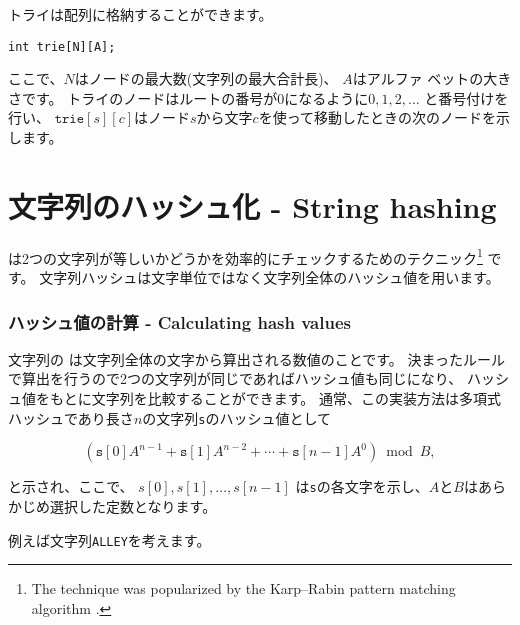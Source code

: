 トライは配列に格納することができます。
\begin{lstlisting}
int trie[N][A];
\end{lstlisting}
ここで、$N$はノードの最大数(文字列の最大合計長)、
$A$はアルファ ベットの大きさです。
トライのノードはルートの番号が0になるように$0,1,2,\ldots$ と番号付けを行い、
$\texttt{trie}[s][c]$はノード$s$から文字$c$を使って移動したときの次のノードを示します。

\section{文字列のハッシュ化 - String hashing}


は2つの文字列が等しいかどうかを効率的にチェックするためのテクニック\footnote{The technique
was popularized by the Karp–Rabin pattern matching
algorithm \cite{kar87}.}
です。
文字列ハッシュは文字単位ではなく文字列全体のハッシュ値を用います。

\subsubsection*{ハッシュ値の計算 - Calculating hash values}


文字列の
は文字列全体の文字から算出される数値のことです。
決まったルールで算出を行うので2つの文字列が同じであればハッシュ値も同じになり、
ハッシュ値をもとに文字列を比較することができます。
通常、この実装方法は多項式ハッシュであり長さ$n$の文字列\texttt{s}のハッシュ値として

\[(\texttt{s}[0] A^{n-1} + \texttt{s}[1] A^{n-2} + \cdots + \texttt{s}[n-1] A^0) \bmod B  ,\]

と示され、ここで、
$s[0],s[1],\ldots,s[n-1]$
は\texttt{s}の各文字を示し、$A$と$B$はあらかじめ選択した定数となります。

例えば文字列\texttt{ALLEY}を考えます。
\begin{center}
\end{center}

